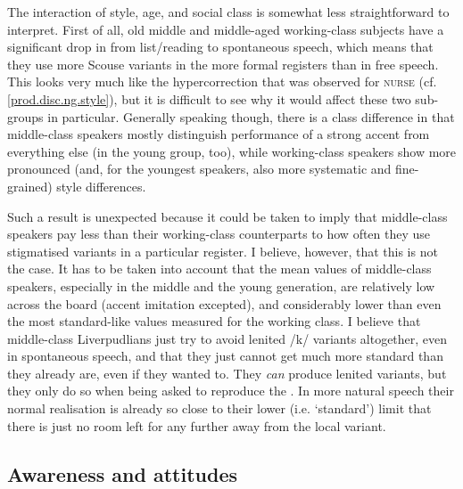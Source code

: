 The interaction of style, age, and social class is somewhat less straightforward to interpret.
First of all, old middle and middle-aged working-class subjects have a significant drop in  from list/reading to spontaneous speech, which means that they use more Scouse variants in the more formal registers than in free speech.
This looks very much like the hypercorrection that was observed for \textsc{nurse} (cf. \ref{prod.disc.ng.style}), but it is difficult to see why it would affect these two sub-groups in particular.
Generally speaking though, there is a class difference in that middle-class speakers mostly distinguish performance of a strong accent from everything else (in the young group, too), while working-class speakers show more pronounced (and, for the youngest speakers, also more systematic and fine-grained) style differences.

Such a result is unexpected because it could be taken to imply that middle-class speakers pay less  than their working-class counterparts to how often they use stigmatised variants in a particular register.
I believe, however, that this is not the case.
It has to be taken into account that the mean  values of middle-class speakers, especially in the middle and the young generation, are relatively low across the board (accent imitation excepted), and considerably lower than even the most standard-like values measured for the working class.
I believe that middle-class Liverpudlians just try to avoid lenited /k/ variants altogether, even in spontaneous speech, and that they just cannot get much more standard than they already are, even if they wanted to.
They \emph{can} produce lenited variants, but they only do so when being asked to reproduce the .
In more natural speech their normal realisation is already so close to their lower (i.e. `standard') limit that there is just no room left for any further  away from the local variant.

\subsection{Awareness and attitudes}
\label{prod.disc.k.aware}


